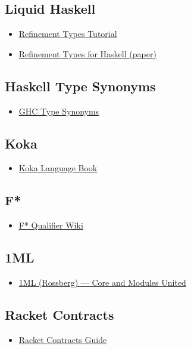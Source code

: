 \documentclass[11pt]{article}
\begin{document}
\subsection{Liquid Haskell}
\label{sec:orgbff9176}
\begin{itemize}
\item \href{https://nikivazou.github.io/lh-course/Lecture\_01\_RefinementTypes.html}{Refinement Types Tutorial}
\item \href{https://goto.ucsd.edu/\~nvazou/refinement\_types\_for\_haskell.pdf}{Refinement Types for Haskell (paper)}
\end{itemize}
\subsection{Haskell Type Synonyms}
\label{sec:orgb1a9154}
\begin{itemize}
\item \href{https://wiki.haskell.org/Type\_synonym}{GHC Type Synonyms}
\end{itemize}
\subsection{Koka}
\label{sec:org027bd7d}
\begin{itemize}
\item \href{https://koka-lang.github.io/koka/doc/book.html}{Koka Language Book}
\end{itemize}
\subsection{F*}
\label{sec:org66dd166}
\begin{itemize}
\item \href{https://github.com/FStarLang/FStar/wiki/Qualifiers-for-definitions-and-declarations}{F* Qualifier Wiki}
\end{itemize}
\subsection{1ML}
\label{sec:org364a6ef}
\begin{itemize}
\item \href{https://people.mpi-sws.org/\~rossberg/1ml/1ml-extended.pdf}{1ML (Rossberg) — Core and Modules United}
\end{itemize}
\subsection{Racket Contracts}
\label{sec:orgd6ded2b}
\begin{itemize}
\item \href{https://docs.racket-lang.org/guide/contracts.html}{Racket Contracts Guide}
\end{itemize}
\end{document}
